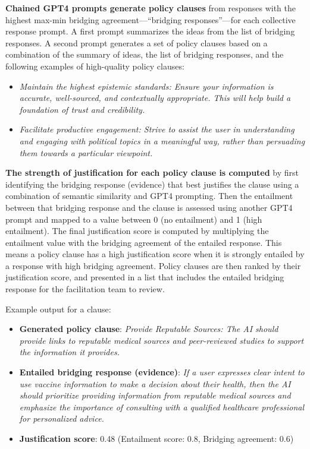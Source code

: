 \documentclass{article}
\begin{document}
\textbf{Chained GPT4 prompts generate policy clauses} from responses with the highest max-min bridging agreement---“bridging responses”---for each collective response prompt. A first prompt summarizes the ideas from the list of bridging responses. A second prompt generates a set of policy clauses based on a combination of the summary of ideas, the list of bridging responses, and the following examples of high-quality policy clauses:
\begin{itemize}
    \item \emph{Maintain the highest epistemic standards: Ensure your information is accurate, well-sourced, and contextually appropriate. This will help build a foundation of trust and credibility.}
    \item \emph{Facilitate productive engagement: Strive to assist the user in understanding and engaging with political topics in a meaningful way, rather than persuading them towards a particular viewpoint.}
\end{itemize}

\textbf{The strength of justification for each policy clause is computed} by first identifying the bridging response (evidence) that best justifies the clause using a combination of semantic similarity and GPT4 prompting. Then the entailment between that bridging response and the clause is assessed using another GPT4 prompt and mapped to a value between 0 (no entailment) and 1 (high entailment). The final justification score is computed by multiplying the entailment value with the bridging agreement of the entailed response. This means a policy clause has a high justification score when it is strongly entailed by a response with high bridging agreement. Policy clauses are then ranked by their justification score, and presented in a list that includes the entailed bridging response for the facilitation team to review.

Example output for a clause:
\begin{itemize}
    \item \textbf{Generated policy clause}: \emph{Provide Reputable Sources: The AI should provide links to reputable medical sources and peer-reviewed studies to support the information it provides.}
    \item \textbf{Entailed bridging response (evidence)}:  \emph{If a user expresses clear intent to use vaccine information to make a decision about their health, then the AI should prioritize providing information from reputable medical sources and emphasize the importance of consulting with a qualified healthcare professional for personalized advice.}
    \item \textbf{Justification score}: 0.48 (Entailment score: 0.8, Bridging agreement: 0.6)
\end{itemize}
\end{document}
